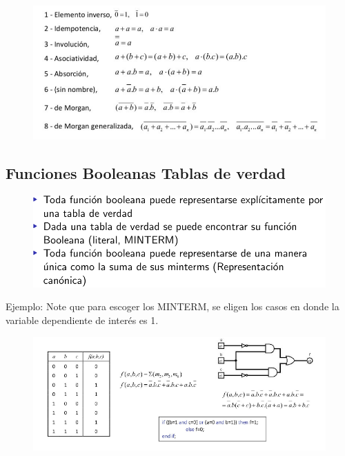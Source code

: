 \documentclass[12pt,letterpaper]{book}
\begin{document}
\begin{figure}[H]
\centering
\includegraphics[width=1\linewidth]{figures/pro1.png}
\caption{ \cite{Beltran} }
\label{pro1}
\end{figure}
\vspace{0.2cm}

\subsection{Funciones Booleanas Tablas de verdad}

\begin{figure}[H]
\centering
\includegraphics[width=1\linewidth]{figures/tabBoo1.png}
\caption{}
\label{tabBoo1}
\end{figure}
\vspace{0.2cm}

Ejemplo:
Note que para escoger los MINTERM, se eligen los casos en donde la variable dependiente de interés es 1.

\begin{figure}[H]
\centering
\includegraphics[width=.5\linewidth]{figures/tabBoo2.png}
\caption{}
\label{tabBoo2}
\end{figure}
\vspace{0.2cm}
\end{document}
